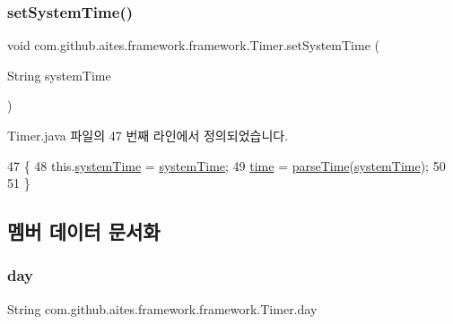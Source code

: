 \subsubsection{\texorpdfstring{set\+System\+Time()}{setSystemTime()}}
{\footnotesize\ttfamily void com.\+github.\+aites.\+framework.\+framework.\+Timer.\+set\+System\+Time (\begin{DoxyParamCaption}\item[{String}]{system\+Time }\end{DoxyParamCaption})}



Timer.\+java 파일의 47 번째 라인에서 정의되었습니다.


\begin{DoxyCode}
47                                                 \{
48         this.\mbox{\hyperlink{classcom_1_1github_1_1aites_1_1framework_1_1framework_1_1_timer_a22ebaa7134740910d846b3bdbd416aef}{systemTime}} = \mbox{\hyperlink{classcom_1_1github_1_1aites_1_1framework_1_1framework_1_1_timer_a22ebaa7134740910d846b3bdbd416aef}{systemTime}};
49         \mbox{\hyperlink{classcom_1_1github_1_1aites_1_1framework_1_1framework_1_1_timer_a04901e0f7fd1f7024218cba52d7a8b26}{time}} = \mbox{\hyperlink{classcom_1_1github_1_1aites_1_1framework_1_1framework_1_1_timer_a4923726c56eab4c2efc2d3f66b0c8cd1}{parseTime}}(\mbox{\hyperlink{classcom_1_1github_1_1aites_1_1framework_1_1framework_1_1_timer_a22ebaa7134740910d846b3bdbd416aef}{systemTime}});
50         
51     \}
\end{DoxyCode}


\subsection{멤버 데이터 문서화}
\mbox{\label{classcom_1_1github_1_1aites_1_1framework_1_1framework_1_1_timer_a875396d63f45c8cd4db75f3b85ac398d}} 
\subsubsection{\texorpdfstring{day}{day}}
{\footnotesize\ttfamily String com.\+github.\+aites.\+framework.\+framework.\+Timer.\+day\hspace{0.3cm}{\ttfamily [private]}}



